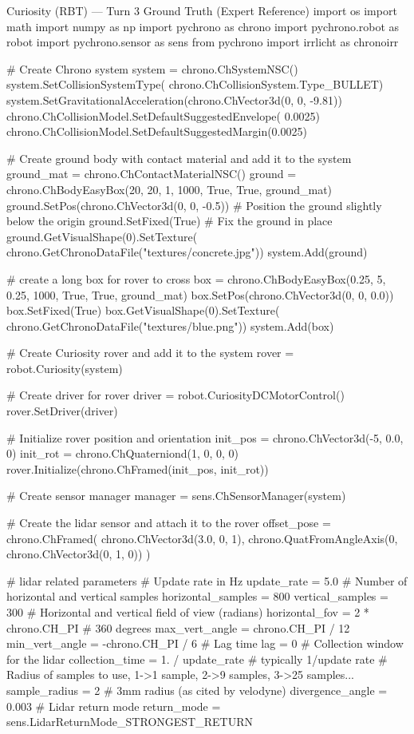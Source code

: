 \begin{CodeBlock}[breakable]{Curiosity (RBT) --- Turn 3 Ground Truth (Expert Reference)}
import os
import math
import numpy as np
import pychrono as chrono
import pychrono.robot as robot
import pychrono.sensor as sens
from pychrono import irrlicht as chronoirr

# Create Chrono system
system = chrono.ChSystemNSC()
system.SetCollisionSystemType(
    chrono.ChCollisionSystem.Type_BULLET)
system.SetGravitationalAcceleration(chrono.ChVector3d(0, 0, -9.81))
chrono.ChCollisionModel.SetDefaultSuggestedEnvelope(
    0.0025)
chrono.ChCollisionModel.SetDefaultSuggestedMargin(0.0025)

# Create ground body with contact material and add it to the system
ground_mat = chrono.ChContactMaterialNSC()
ground = chrono.ChBodyEasyBox(20, 20, 1, 1000, True, True, ground_mat)
ground.SetPos(chrono.ChVector3d(0, 0, -0.5))  # Position the ground slightly below the origin
ground.SetFixed(True)  # Fix the ground in place
ground.GetVisualShape(0).SetTexture(
    chrono.GetChronoDataFile("textures/concrete.jpg"))
system.Add(ground)

# create a long box for rover to cross
box = chrono.ChBodyEasyBox(0.25, 5, 0.25, 1000, True, True, ground_mat)
box.SetPos(chrono.ChVector3d(0, 0, 0.0))
box.SetFixed(True)
box.GetVisualShape(0).SetTexture(
    chrono.GetChronoDataFile("textures/blue.png"))
system.Add(box)

# Create Curiosity rover and add it to the system
rover = robot.Curiosity(system)

# Create driver for rover
driver = robot.CuriosityDCMotorControl()
rover.SetDriver(driver)

# Initialize rover position and orientation
init_pos = chrono.ChVector3d(-5, 0.0, 0)
init_rot = chrono.ChQuaterniond(1, 0, 0, 0)
rover.Initialize(chrono.ChFramed(init_pos, init_rot))

# Create sensor manager
manager = sens.ChSensorManager(system)

# Create the lidar sensor and attach it to the rover
offset_pose = chrono.ChFramed(
        chrono.ChVector3d(3.0, 0, 1), chrono.QuatFromAngleAxis(0, chrono.ChVector3d(0, 1, 0))
    )

# lidar related parameters
# Update rate in Hz
update_rate = 5.0
# Number of horizontal and vertical samples
horizontal_samples = 800
vertical_samples = 300
# Horizontal and vertical field of view (radians)
horizontal_fov = 2 * chrono.CH_PI  # 360 degrees
max_vert_angle = chrono.CH_PI / 12
min_vert_angle = -chrono.CH_PI / 6
# Lag time
lag = 0
# Collection window for the lidar
collection_time = 1. / update_rate  # typically 1/update rate
# Radius of samples to use, 1->1 sample, 2->9 samples, 3->25 samples...
sample_radius = 2
# 3mm radius (as cited by velodyne)
divergence_angle = 0.003
# Lidar return mode
return_mode = sens.LidarReturnMode_STRONGEST_RETURN


\end{CodeBlock}
